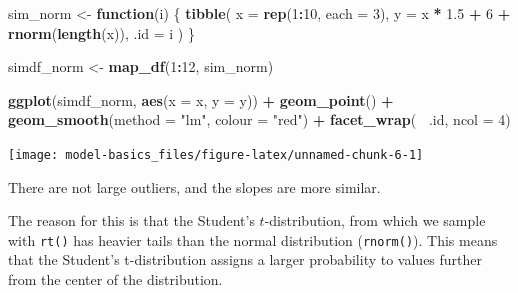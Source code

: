 \documentclass[]{book}
\newenvironment{Shaded}{\begin{snugshade}}{\end{snugshade}}
\newcommand{\ControlFlowTok}[1]{\textcolor[rgb]{0.13,0.29,0.53}{\textbf{#1}}}
\newcommand{\DataTypeTok}[1]{\textcolor[rgb]{0.13,0.29,0.53}{#1}}
\newcommand{\DecValTok}[1]{\textcolor[rgb]{0.00,0.00,0.81}{#1}}
\newcommand{\FloatTok}[1]{\textcolor[rgb]{0.00,0.00,0.81}{#1}}
\newcommand{\KeywordTok}[1]{\textcolor[rgb]{0.13,0.29,0.53}{\textbf{#1}}}
\newcommand{\NormalTok}[1]{#1}
\newcommand{\OperatorTok}[1]{\textcolor[rgb]{0.81,0.36,0.00}{\textbf{#1}}}
\newcommand{\StringTok}[1]{\textcolor[rgb]{0.31,0.60,0.02}{#1}}
\theoremstyle{plain}
\theoremstyle{remark}
\begin{document}
\begin{Shaded}
\begin{Highlighting}[]
\NormalTok{sim_norm <-}\StringTok{ }\ControlFlowTok{function}\NormalTok{(i) \{}
  \KeywordTok{tibble}\NormalTok{(}
    \DataTypeTok{x =} \KeywordTok{rep}\NormalTok{(}\DecValTok{1}\OperatorTok{:}\DecValTok{10}\NormalTok{, }\DataTypeTok{each =} \DecValTok{3}\NormalTok{),}
    \DataTypeTok{y =}\NormalTok{ x }\OperatorTok{*}\StringTok{ }\FloatTok{1.5} \OperatorTok{+}\StringTok{ }\DecValTok{6} \OperatorTok{+}\StringTok{ }\KeywordTok{rnorm}\NormalTok{(}\KeywordTok{length}\NormalTok{(x)),}
    \DataTypeTok{.id =}\NormalTok{ i}
\NormalTok{  )}
\NormalTok{\}}

\NormalTok{simdf_norm <-}\StringTok{ }\KeywordTok{map_df}\NormalTok{(}\DecValTok{1}\OperatorTok{:}\DecValTok{12}\NormalTok{, sim_norm)}

\KeywordTok{ggplot}\NormalTok{(simdf_norm, }\KeywordTok{aes}\NormalTok{(}\DataTypeTok{x =}\NormalTok{ x, }\DataTypeTok{y =}\NormalTok{ y)) }\OperatorTok{+}
\StringTok{  }\KeywordTok{geom_point}\NormalTok{() }\OperatorTok{+}
\StringTok{  }\KeywordTok{geom_smooth}\NormalTok{(}\DataTypeTok{method =} \StringTok{"lm"}\NormalTok{, }\DataTypeTok{colour =} \StringTok{"red"}\NormalTok{) }\OperatorTok{+}
\StringTok{  }\KeywordTok{facet_wrap}\NormalTok{(}\OperatorTok{~}\StringTok{ }\NormalTok{.id, }\DataTypeTok{ncol =} \DecValTok{4}\NormalTok{)}
\end{Highlighting}
\end{Shaded}

\begin{center}\texttt{[image: model-basics\_files/figure-latex/unnamed-chunk-6-1]} \end{center}

There are not large outliers, and the slopes are more similar.

The reason for this is that the Student's \(t\)-distribution, from which we sample with \texttt{rt()} has heavier tails than the normal distribution (\texttt{rnorm()}). This means that the Student's t-distribution
assigns a larger probability to values further from the center of the distribution.

\begin{Shaded}
\end{Shaded}
\end{document}
